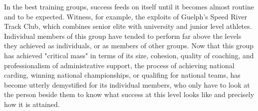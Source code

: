 In the best training groups, success feeds on itself until it becomes almost routine and to be expected. Witness, for example, the exploits of Guelph's Speed River Track Club, which combines senior elite with university and junior level athletes. Individual members of this group have tended to perform far above the levels they achieved as individuals, or as members of other groups. Now that this group has achieved "critical mass" in terms of its size, cohesion, quality of coaching, and professionalism of administrative support, the process of achieving national carding, winning national championships, or qualifing for national teams, has become utterly demystified for its individual members, who only have to look at the person beside them to know what success at this level looks like and precisely how it is attained.




